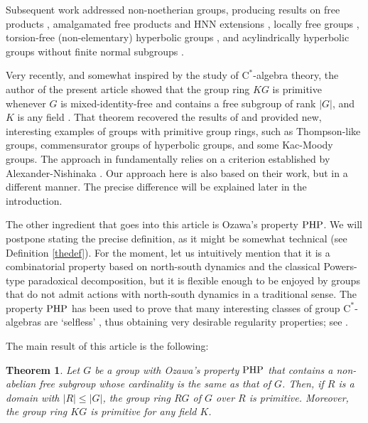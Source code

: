 \documentclass[11pt]{article}
\newtheorem{thm}{Theorem}[section]
\theoremstyle{definition}
\theoremstyle{remark}
\numberwithin{equation}{section}
\numberwithin{equation}{section}
\newcommand{\Cs}{\ensuremath{\mathrm{C}^\ast}}
\numberwithin{equation}{section}
\begin{document}
Subsequent work addressed non-noetherian groups, producing results on free products \cite{Fo73}, amalgamated free products and HNN extensions \cite{Bo89,Ni07,AlNi17}, locally free groups \cite{Ni11}, torsion-free (non-elementary) hyperbolic groups \cite{So18}, and acylindrically hyperbolic groups without finite normal subgroups \cite{AbDa19}. 

Very recently, and somewhat inspired by the study of \Cs-algebra theory, the author of the present article showed that the group ring $KG$ is primitive whenever $G$ is mixed-identity-free and contains a free subgroup of rank $|G|$, and $K$ is any field \cite{Fl26}. That theorem recovered the results of \cite{Fo73,Bo89,So18,AbDa19} and provided new, interesting examples of groups with primitive group rings, such as Thompson-like groups, commensurator groups of hyperbolic groups, and some Kac-Moody groups. The approach in \cite{Fl26} fundamentally relies on a criterion established by Alexander-Nishinaka \cite{AlNi17}. Our approach here is also based on their work, but in a different manner. The precise difference will be explained later in the introduction.


The other ingredient that goes into this article is Ozawa's property $\rm PHP$. We will postpone stating the precise definition, as it might be somewhat technical (see Definition \ref{thedef}). For the moment, let us intuitively mention that it is a combinatorial property based on north-south dynamics and the classical Powers-type paradoxical decomposition, but it is flexible enough to be enjoyed by groups that do not admit actions with north-south dynamics in a traditional sense. The property $\rm PHP$ has been used to prove that many interesting classes of group \Cs-algebras are `selfless' \cite{Oz25,Vi26,FKOCP26,BaFl26,Ry26}, thus obtaining very desirable regularity properties; see \cite{Ro25}. 


The main result of this article is the following:

\begin{thm}\label{mainthm}
   Let $G$ be a group with Ozawa's property ${\rm PHP}$ that contains a non-abelian free subgroup whose cardinality is the same as that of $G$. Then, if $R$ is a domain with $|R|\leq |G|$, the group ring $RG$ of $G$ over $R$ is primitive. Moreover, the group ring $KG$ is primitive for any field $K$.
\end{thm}
\end{document}
